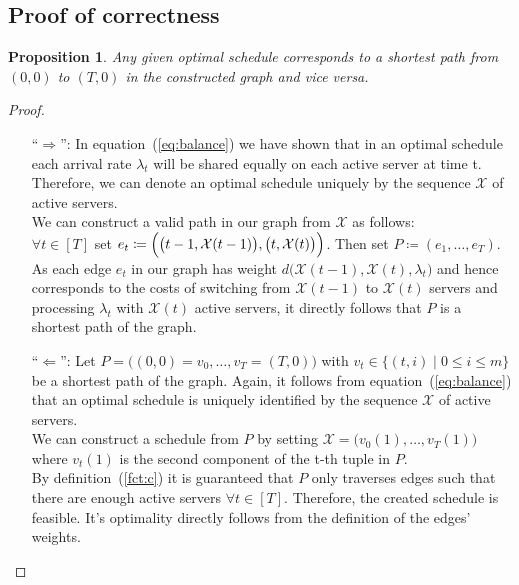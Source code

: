 \documentclass[hidelinks]{article}
\theoremstyle{plain}
\newtheorem{prop}{Proposition}[section]
\theoremstyle{definition}
\theoremstyle{rem}
\begin{document}
\begin{sloppypar}
\subsection{Proof of correctness}
\begin{prop}
Any given optimal schedule corresponds to a shortest path from $(0,0)$ to $(T,0)$ in the constructed graph and vice versa.
\end{prop} 
\begin{proof}
$ $
\begin{itemize}
	\item[``$\Rightarrow$'':] In equation~(\ref{eq:balance}) we have shown that in an optimal schedule each arrival rate $\lambda_t$ will be shared equally on each active server at time t. Therefore, we can denote an optimal schedule uniquely by the sequence $\mathcal{X}$ of active servers.\\
We can construct a valid path in our graph from $\mathcal{X}$ as follows:\\
$\forall t\in[T]$ set $e_t\coloneqq\Bigl(\bigl(t-1,\mathcal{X}(t-1)\bigr),\bigl(t,\mathcal{X}(t)\bigr)\Bigr)$. Then set $P\coloneqq(e_1,\ldots,e_{T})$.\\
As each edge $e_t$ in our graph has weight $d\bigl(\mathcal{X}(t-1),\mathcal{X}(t),\lambda_{t}\bigr)$ and hence corresponds to the costs of switching from $\mathcal{X}(t-1)$ to $\mathcal{X}(t)$ servers and processing $\lambda_{t}$ with $\mathcal{X}(t)$ active servers, it directly follows that $P$ is a shortest path of the graph.

	\item[``$\Leftarrow$'':] Let $P=\bigl((0,0)=v_0,\ldots,v_T=(T,0)\bigr)$ with $v_t\in\bigl\{(t,i)\mid 0\le i\le m\bigr\}$ be a shortest path of the graph. Again, it follows from equation~(\ref{eq:balance}) that an optimal schedule is uniquely identified by the sequence $\mathcal{X}$ of active servers.\\
We can construct a schedule from $P$ by setting $\mathcal{X}=\bigl(v_0(1),\ldots,v_T(1)\bigr)$ where $v_t(1)$ is the second component of the t-th tuple in $P$.\\
By definition~(\ref{fct:c}) it is guaranteed that $P$ only traverses edges such that there are enough active servers $\forall t\in[T]$. Therefore, the created schedule is feasible. It's optimality directly follows from the definition of the edges' weights.\\
\end{itemize}
\end{proof}


\end{sloppypar}
\end{document}
